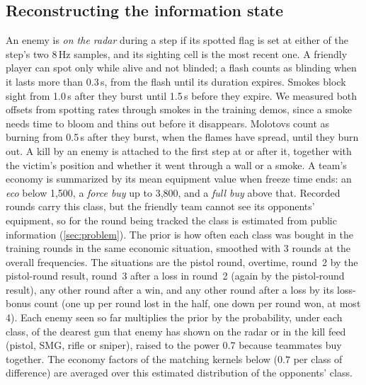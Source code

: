 \documentclass[11pt]{article}
\newcommand{\1}{\mathbb{1}}
\begin{document}
\subsection{Reconstructing the information state}
\label{sec:infostate}
An enemy is \emph{on the radar} during a step if its spotted flag is set at either of the step's two 8\,Hz samples, and its sighting cell is the most recent one. A friendly player can spot only while alive and not blinded; a flash counts as blinding when it lasts more than 0.3\,s, from the flash until its duration expires. Smokes block sight from 1.0\,s after they burst until 1.5\,s before they expire. We measured both offsets from spotting rates through smokes in the training demos, since a smoke needs time to bloom and thins out before it disappears. Molotovs count as burning from 0.5\,s after they burst, when the flames have spread, until they burn out. A kill by an enemy is attached to the first step at or after it, together with the victim's position and whether it went through a wall or a smoke. A team's economy is summarized by its mean equipment value when freeze time ends: an \emph{eco} below 1{,}500, a \emph{force buy} up to 3{,}800, and a \emph{full buy} above that. Recorded rounds carry this class, but the friendly team cannot see its opponents' equipment, so for the round being tracked the class is estimated from public information (\cref{sec:problem}). The prior is how often each class was bought in the training rounds in the same economic situation, smoothed with 3 rounds at the overall frequencies. The situations are the pistol round, overtime, round~2 by the pistol-round result, round~3 after a loss in round~2 (again by the pistol-round result), any other round after a win, and any other round after a loss by its loss-bonus count (one up per round lost in the half, one down per round won, at most 4). Each enemy seen so far multiplies the prior by the probability, under each class, of the dearest gun that enemy has shown on the radar or in the kill feed (pistol, SMG, rifle or sniper), raised to the power 0.7 because teammates buy together. The economy factors of the matching kernels below ($0.7$ per class of difference) are averaged over this estimated distribution of the opponents' class.
\end{document}
